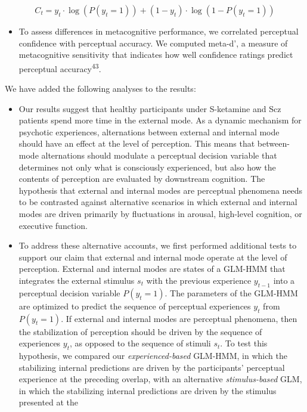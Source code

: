\documentclass[
]{article}
\providecommand{\tightlist}{%
  \setlength{\itemsep}{0pt}\setlength{\parskip}{0pt}}
\begin{document}
\[
C_t = y_t \cdot \log(P(y_t = 1)) + (1 - y_t) \cdot \log(1 - P(y_t = 1))  
\]

\begin{itemize}
\tightlist
\item
  To assess differences in metacognitive performance, we correlated
  perceptual confidence with perceptual accuracy. We computed meta-d', a
  measure of metacognitive sensitivity that indicates how well
  confidence ratings predict perceptual accuracy\textsuperscript{43}.
\end{itemize}

We have added the following analyses to the results:

\begin{itemize}
\item
  Our results suggest that healthy participants under S-ketamine and Scz
  patients spend more time in the external mode. As a dynamic mechanism
  for psychotic experiences, alternations between external and internal
  mode should have an effect at the level of perception. This means that
  between-mode alternations should modulate a perceptual decision
  variable that determines not only what is consciously experienced, but
  also how the contents of perception are evaluated by downstream
  cognition. The hypothesis that external and internal modes are
  perceptual phenomena needs to be contrasted against alternative
  scenarios in which external and internal modes are driven primarily by
  fluctuations in arousal, high-level cognition, or executive function.
\item
  To address these alternative accounts, we first performed additional
  tests to support our claim that external and internal mode operate at
  the level of perception. External and internal modes are states of a
  GLM-HMM that integrates the external stimulus \(s_t\) with the
  previous experience \(y_{t-1}\) into a perceptual decision variable
  \(P(y_t = 1)\). The parameters of the GLM-HMM are optimized to predict
  the sequence of perceptual experiences \(y_t\) from \(P(y_t = 1)\). If
  external and internal modes are perceptual phenomena, then the
  stabilization of perception should be driven by the sequence of
  experiences \(y_t\), as opposed to the sequence of stimuli \(s_t\). To
  test this hypothesis, we compared our \emph{experienced-based}
  GLM-HMM, in which the stabilizing internal predictions are driven by
  the participants' perceptual experience at the preceding overlap, with
  an alternative \emph{stimulus-based} GLM, in which the stabilizing
  internal predictions are driven by the stimulus presented at the

\end{itemize}
\end{document}
